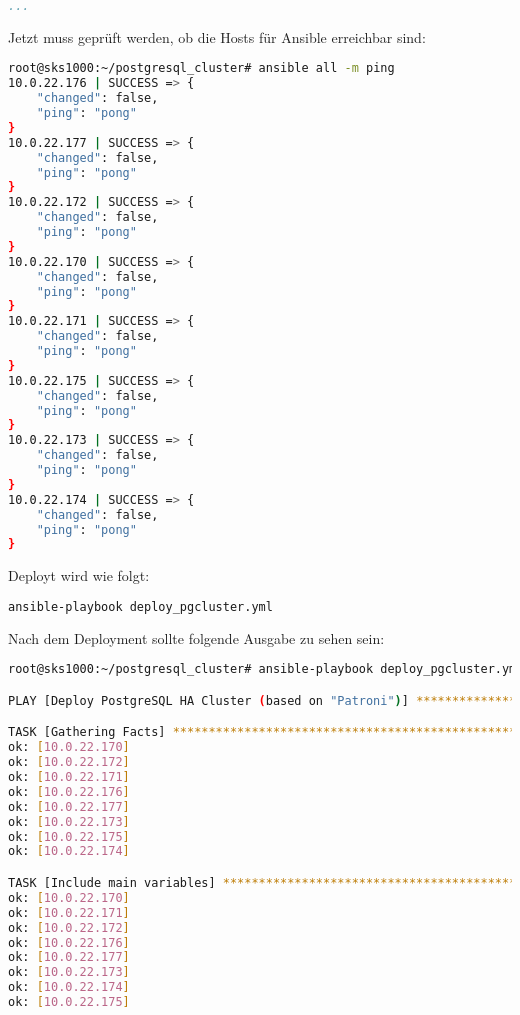 \begin{flushleft}
\begin{lstlisting}[language=yaml, caption=Testsystem - Deployment - main.yml,captionpos=b,label={lst:testsystem-deployment-main.yml},breaklines=true]
...

    \end{lstlisting}
    Jetzt muss geprüft werden, ob die Hosts für Ansible erreichbar sind:
    \lstset{style=gra_codestyle}
    \begin{lstlisting}[language=bash, caption=Deploy - Anhang - Ansible Ping,captionpos=b,label={lst:deploy-appendix-ansible-ping},breaklines=true]
root@sks1000:~/postgresql_cluster# ansible all -m ping
10.0.22.176 | SUCCESS => {
    "changed": false,
    "ping": "pong"
}
10.0.22.177 | SUCCESS => {
    "changed": false,
    "ping": "pong"
}
10.0.22.172 | SUCCESS => {
    "changed": false,
    "ping": "pong"
}
10.0.22.170 | SUCCESS => {
    "changed": false,
    "ping": "pong"
}
10.0.22.171 | SUCCESS => {
    "changed": false,
    "ping": "pong"
}
10.0.22.175 | SUCCESS => {
    "changed": false,
    "ping": "pong"
}
10.0.22.173 | SUCCESS => {
    "changed": false,
    "ping": "pong"
}
10.0.22.174 | SUCCESS => {
    "changed": false,
    "ping": "pong"
}
    \end{lstlisting}

    Deployt wird wie folgt:
    \lstset{style=gra_codestyle}
    \begin{lstlisting}[language=bash, caption=Deploy - Anhang - deploy\_pgcluster.yml,captionpos=b,label={lst:deploy-appendix-pgcluster},breaklines=true]
ansible-playbook deploy_pgcluster.yml
    \end{lstlisting}
    Nach dem Deployment sollte folgende Ausgabe zu sehen sein:
    \lstset{style=gra_codestyle}
    \begin{lstlisting}[language=bash, caption=Deploy - Anhang - Deployt,captionpos=b,label={lst:deploy-appendix-deployt},breaklines=true]
root@sks1000:~/postgresql_cluster# ansible-playbook deploy_pgcluster.yml

PLAY [Deploy PostgreSQL HA Cluster (based on "Patroni")] **********************************************************************************************************************************************************

TASK [Gathering Facts] ********************************************************************************************************************************************************************************************
ok: [10.0.22.170]
ok: [10.0.22.172]
ok: [10.0.22.171]
ok: [10.0.22.176]
ok: [10.0.22.177]
ok: [10.0.22.173]
ok: [10.0.22.175]
ok: [10.0.22.174]

TASK [Include main variables] *************************************************************************************************************************************************************************************
ok: [10.0.22.170]
ok: [10.0.22.171]
ok: [10.0.22.172]
ok: [10.0.22.176]
ok: [10.0.22.177]
ok: [10.0.22.173]
ok: [10.0.22.174]
ok: [10.0.22.175]


\end{lstlisting}
\end{flushleft}
